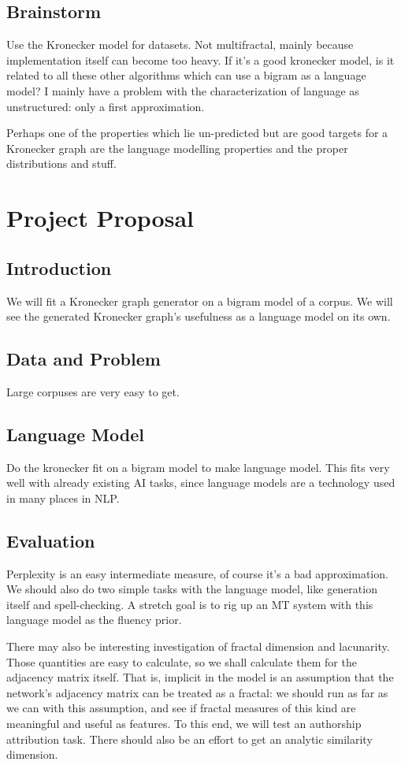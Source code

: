 \documentclass[12pt]{article}
\begin{document}
\subsection{Brainstorm}

Use the Kronecker model for datasets. Not multifractal, mainly because implementation itself can become too heavy. If it's a good kronecker model, is it related to all these other algorithms which can use a bigram as a language model? I mainly have a problem with the characterization of language as unstructured: only a first approximation.

Perhaps one of the properties which lie un-predicted but are good targets for a Kronecker graph are the language modelling properties and the proper distributions and stuff.

\section{Project Proposal}

\subsection{Introduction}
We will fit a Kronecker graph generator on a bigram model of a corpus. We will see the generated Kronecker graph's usefulness as a language model on its own.
\subsection{Data and Problem}
Large corpuses are very easy to get. %
\subsection{Language Model}
Do the kronecker fit on a bigram model to make language model. This fits very well with already existing AI tasks, since language models are a technology used in many places in NLP.
\subsection{Evaluation}
Perplexity is an easy intermediate measure, of course it's a bad approximation. We should also do two simple tasks with the language model, like generation itself and spell-checking. A stretch goal is to rig up an MT system with this language model as the fluency prior.

There may also be interesting investigation of fractal dimension and lacunarity. Those quantities are easy to calculate, so we shall calculate them for the adjacency matrix itself. That is, implicit in the model is an assumption that the network's adjacency matrix can be treated as a fractal: we should run as far as we can with this assumption, and see if fractal measures of this kind are meaningful and useful as features. To this end, we will test an authorship attribution task. There should also be an effort to get an analytic similarity dimension.

\end{document}
